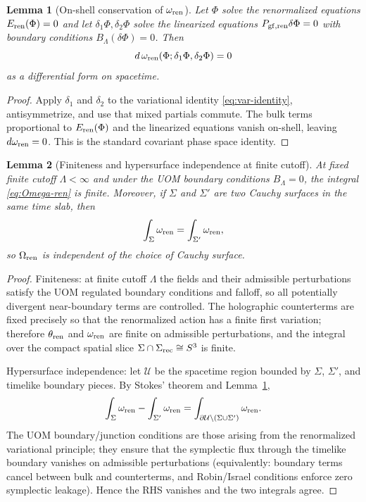 \documentclass[10pt]{article}
\theoremstyle{definition}
\theoremstyle{plain}
\newtheorem{lemma}{Lemma}[section]
\begin{document}
\begin{lemma}[On-shell conservation of $\omega_{\rm ren}$]
\label{lem:omega-closed}
Let $\Phi$ solve the renormalized equations $E_{\rm ren}(\Phi)=0$ and let $\delta_1\Phi,\delta_2\Phi$ solve the linearized equations
$P_{\rm gf,ren}\delta\Phi=0$ with boundary conditions $B_\Lambda(\delta\Phi)=0$. Then
\[
d\,\omega_{\rm ren}(\Phi;\delta_1\Phi,\delta_2\Phi)=0
\]
as a differential form on spacetime.
\end{lemma}

\begin{proof}
Apply $\delta_1$ and $\delta_2$ to the variational identity \eqref{eq:var-identity}, antisymmetrize, and use that mixed partials commute.
The bulk terms proportional to $E_{\rm ren}(\Phi)$ and the linearized equations vanish on-shell, leaving $d\omega_{\rm ren}=0$.
This is the standard covariant phase space identity.
\end{proof}

\begin{lemma}[Finiteness and hypersurface independence at finite cutoff]
\label{lem:Omega-finite-independent}
At fixed finite cutoff $\Lambda<\infty$ and under the UOM boundary conditions $B_\Lambda=0$, the integral \eqref{eq:Omega-ren} is finite.
Moreover, if $\Sigma$ and $\Sigma'$ are two Cauchy surfaces in the same time slab, then
\[
\int_{\Sigma}\omega_{\rm ren}=\int_{\Sigma'}\omega_{\rm ren},
\]
so $\Omega_{\rm ren}$ is independent of the choice of Cauchy surface.
\end{lemma}

\begin{proof}
Finiteness: at finite cutoff $\Lambda$ the fields and their admissible perturbations satisfy the UOM regulated boundary conditions and falloff,
so all potentially divergent near-boundary terms are controlled. The holographic counterterms are fixed precisely so that the renormalized action
has a finite first variation; therefore $\theta_{\rm ren}$ and $\omega_{\rm ren}$ are finite on admissible perturbations, and the integral over the
compact spatial slice $\Sigma\cap\Sigma_{\rm rec}\cong S^3$ is finite.

Hypersurface independence: let $\mathcal U$ be the spacetime region bounded by $\Sigma$, $\Sigma'$, and timelike boundary pieces.
By Stokes' theorem and Lemma~\ref{lem:omega-closed},
\[
\int_{\Sigma}\omega_{\rm ren}-\int_{\Sigma'}\omega_{\rm ren}
=\int_{\partial\mathcal U\setminus(\Sigma\cup\Sigma')}\omega_{\rm ren}.
\]
The UOM boundary/junction conditions are those arising from the renormalized variational principle; they ensure that the symplectic flux through
the timelike boundary vanishes on admissible perturbations (equivalently: boundary terms cancel between bulk and counterterms, and Robin/Israel
conditions enforce zero symplectic leakage). Hence the RHS vanishes and the two integrals agree.
\end{proof}
\end{document}
